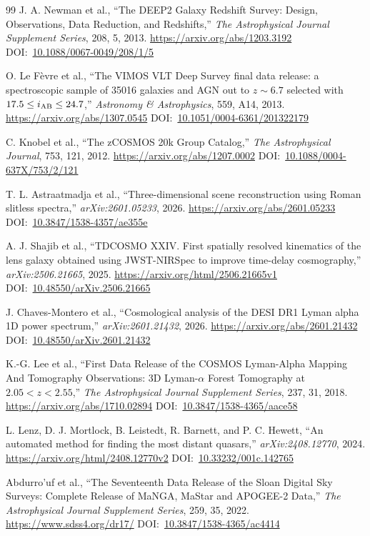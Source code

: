 \documentclass[10pt,onecolumn]{article}
\newcommand{\doi}[1]{DOI:~\href{https://doi.org/#1}{#1}}
\begin{document}
\begin{thebibliography}{99}
J. A. Newman et al.,
``The DEEP2 Galaxy Redshift Survey: Design, Observations, Data Reduction, and Redshifts,''
\emph{The Astrophysical Journal Supplement Series}, 208, 5, 2013.
\url{https://arxiv.org/abs/1203.3192}
\doi{10.1088/0067-0049/208/1/5}

O. Le F\`evre et al.,
``The VIMOS VLT Deep Survey final data release: a spectroscopic sample of 35016 galaxies and AGN out to $z\sim6.7$ selected with $17.5\le i_{\rm AB}\le24.7$,''
\emph{Astronomy \& Astrophysics}, 559, A14, 2013.
\url{https://arxiv.org/abs/1307.0545}
\doi{10.1051/0004-6361/201322179}

C. Knobel et al.,
``The zCOSMOS 20k Group Catalog,''
\emph{The Astrophysical Journal}, 753, 121, 2012.
\url{https://arxiv.org/abs/1207.0002}
\doi{10.1088/0004-637X/753/2/121}

T. L. Astraatmadja et al.,
``Three-dimensional scene reconstruction using Roman slitless spectra,''
\emph{arXiv:2601.05233}, 2026.
\url{https://arxiv.org/abs/2601.05233}
\doi{10.3847/1538-4357/ae355e}

A. J. Shajib et al.,
``TDCOSMO XXIV. First spatially resolved kinematics of the lens galaxy obtained using JWST-NIRSpec to improve time-delay cosmography,''
\emph{arXiv:2506.21665}, 2025.
\url{https://arxiv.org/html/2506.21665v1}
\doi{10.48550/arXiv.2506.21665}

J. Chaves-Montero et al.,
``Cosmological analysis of the DESI DR1 Lyman alpha 1D power spectrum,''
\emph{arXiv:2601.21432}, 2026.
\url{https://arxiv.org/abs/2601.21432}
\doi{10.48550/arXiv.2601.21432}

K.-G. Lee et al.,
``First Data Release of the COSMOS Lyman-Alpha Mapping And Tomography Observations: 3D Lyman-$\alpha$ Forest Tomography at $2.05<z<2.55$,''
\emph{The Astrophysical Journal Supplement Series}, 237, 31, 2018.
\url{https://arxiv.org/abs/1710.02894}
\doi{10.3847/1538-4365/aace58}

L. Lenz, D. J. Mortlock, B. Leistedt, R. Barnett, and P. C. Hewett,
``An automated method for finding the most distant quasars,''
\emph{arXiv:2408.12770}, 2024.
\url{https://arxiv.org/html/2408.12770v2}
\doi{10.33232/001c.142765}

Abdurro'uf et al.,
``The Seventeenth Data Release of the Sloan Digital Sky Surveys: Complete Release of MaNGA, MaStar and APOGEE-2 Data,''
\emph{The Astrophysical Journal Supplement Series}, 259, 35, 2022.
\url{https://www.sdss4.org/dr17/}
\doi{10.3847/1538-4365/ac4414}


\end{thebibliography}
\end{document}
